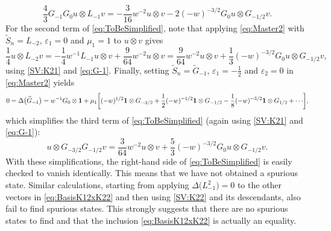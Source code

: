 \documentclass[a4paper,reqno,12pt]{report}
\theoremstyle{definition}
\numberwithin{equation}{section}
\let\originalleft\left     %
\let\originalright\right
\renewcommand{\left}{\mathopen{}\mathclose\bgroup\originalleft}
\renewcommand{\right}{\aftergroup\egroup\originalright}
\newcommand{\sqbrac}[1]{\left[ #1 \right]}
\newcommand{\wun}{\mathbf{1}}  %
\newcommand{\coproductsymb}{\Delta}                                                %
\newcommand{\coproduct}[1]{\coproductsymb \bigl( #1 \bigr)}                        %
\newcommand{\rhs}{right-hand side}
\newcommand{\eps}{\varepsilon}
\newcommand{\tS}{\widetilde{S}}
\theoremstyle{plain}
\newcommand{\tG}{\widetilde{G}}
\begin{document}
\begin{equation}
\frac{4}{3} G_{-1} G_0 u \otimes L_{-1} v = -\frac{3}{16} w^{-2} u \otimes v - 2 (-w)^{-3/2} G_0 u \otimes G_{-1/2} v.
\end{equation}
For the second term of \eqref{eq:ToBeSimplified}, note that applying \eqref{eq:Master2} with $\tS_n = L_{-2}$, $\eps_1 = 0$ and $\mu_1 = 1$ to $u \otimes v$ gives
\begin{equation}
\frac{1}{4} u \otimes L_{-2} v = -\frac{1}{4} w^{-1} L_{-1} u \otimes v + \frac{9}{64} w^{-2} u \otimes v = \frac{9}{64} w^{-2} u \otimes v + \frac{1}{3} (-w)^{-3/2} G_0 u \otimes G_{-1/2} v,
\end{equation}
using \eqref{SV:K21} and \eqref{eq:G-1}.  Finally, setting $\tS_n = \tG_{-1}$, $\eps_1 = -\frac{1}{2}$ and $\eps_2 = 0$ in \eqref{eq:Master2} yields
\begin{equation}
0 = \coproduct{\tG_{-1}} = w^{-1} G_0 \otimes \wun + \mu_1 \sqbrac{(-w)^{1/2} \wun \otimes G_{-3/2} + \frac{1}{2} (-w)^{-1/2} \wun \otimes G_{-1/2} - \frac{1}{8} (-w)^{-3/2} \wun \otimes G_{1/2} + \cdots},
\end{equation}
which simplifies the third term of \eqref{eq:ToBeSimplified} (again using \eqref{SV:K21} and \eqref{eq:G-1}):
\begin{equation}
u \otimes G_{-3/2} G_{-1/2} v = \frac{3}{64} w^{-2} u \otimes v + \frac{5}{3} (-w)^{-3/2} G_0 u \otimes G_{-1/2} v.
\end{equation}
With these simplifications, the \rhs{} of \eqref{eq:ToBeSimplified} is easily checked to vanish identically.  This means that we have not obtained a spurious state.  Similar calculations, starting from applying $\coproduct{L_{-1}^2} = 0$ to the other vectors in \eqref{eq:BasisK12xK22} and then using \eqref{SV:K22} and its descendants, also fail to find spurious states.  This strongly suggests that there are no spurious states to find and that the inclusion \eqref{eq:BasisK12xK22} is actually an equality.
\end{document}
